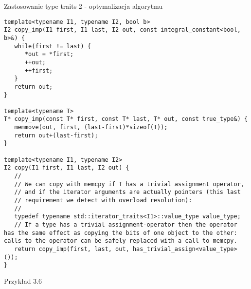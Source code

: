 \documentclass[11pt]{beamer}
\begin{document}
\begin{frame}[fragile]{Zastosowanie type traits 2 - optymalizacja algorytmu}
 \begin{lstlisting}[frame=single,basicstyle=\tiny]
template<typename I1, typename I2, bool b>
I2 copy_imp(I1 first, I1 last, I2 out, const integral_constant<bool, b>&) {
   while(first != last) {
      *out = *first;
      ++out;
      ++first;
   }
   return out;
}

template<typename T>
T* copy_imp(const T* first, const T* last, T* out, const true_type&) {
   memmove(out, first, (last-first)*sizeof(T));
   return out+(last-first);
}

template<typename I1, typename I2>
I2 copy(I1 first, I1 last, I2 out) {
   //
   // We can copy with memcpy if T has a trivial assignment operator,
   // and if the iterator arguments are actually pointers (this last
   // requirement we detect with overload resolution):
   //
   typedef typename std::iterator_traits<I1>::value_type value_type;
   // If a type has a trivial assignment-operator then the operator has the same effect as copying the bits of one object to the other: calls to the operator can be safely replaced with a call to memcpy.
   return copy_imp(first, last, out, has_trivial_assign<value_type>());
}
    \end{lstlisting}
    \alert{Przykład 3.6}
\end{frame}
\end{document}
